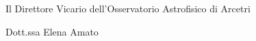 \begin{flushright}
\begin{minipage}[c]{9cm}
\begin{center}
Il Direttore Vicario dell'Osservatorio Astrofisico di Arcetri

Dott.ssa Elena Amato
\end{center}
\end{minipage}
\end{flushright}


